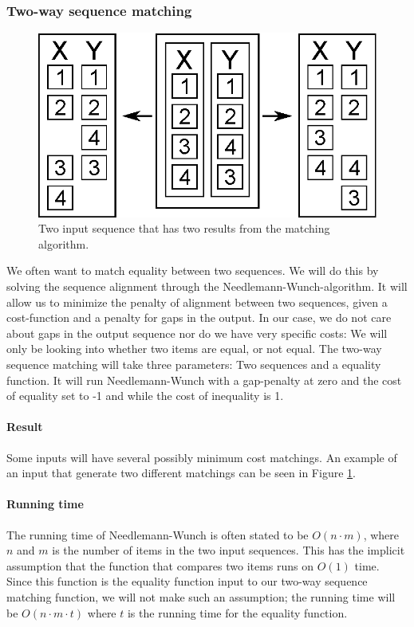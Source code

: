 \documentclass[11pt]{article}
\begin{document}
\subsubsection{Two-way sequence matching}
\begin{figure}
   \centerline{\includegraphics[scale=0.4]{drawings/eps/mincostsequencematchingambigious.eps}}
   \caption{Two input sequence that has two results from the matching algorithm.}
   \label{TwoWayMatchingAmbigiouty}
\end{figure}

We often want to match equality between two sequences. We will do this by solving the sequence alignment through the Needlemann-Wunch-algorithm. It will allow us to minimize the penalty of alignment between two sequences, given a cost-function and a penalty for gaps in the output. In our case, we do not care about gaps in the output sequence nor do we have very specific costs: We will only be looking into whether two items are equal, or not equal. The two-way sequence matching will take three parameters: Two sequences and a equality function. It will run Needlemann-Wunch with a gap-penalty at zero and the cost of equality set to -1 and while the cost of inequality is 1.

\paragraph{Result} Some inputs will have several possibly minimum cost matchings. An example of an input that generate two different matchings can be seen in Figure \ref{TwoWayMatchingAmbigiouty}.

\paragraph{Running time} The running time of Needlemann-Wunch is often stated to be $O(n \cdot m)$, where $n$ and $m$ is the number of items in the two input sequences. This has the implicit assumption that the function that compares two items runs on $O(1)$ time. Since this function is the equality function input to our two-way sequence matching function, we will not make such an assumption; the running time will be $O(n \cdot m \cdot t)$ where $t$ is the running time for the equality function.
\end{document}
